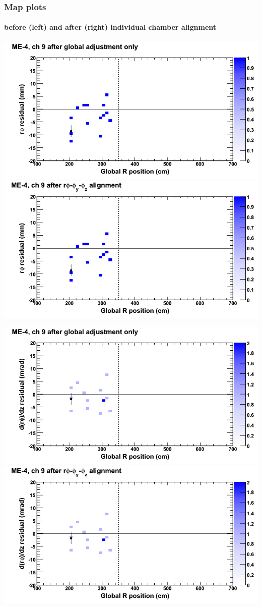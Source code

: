 \documentclass[compress]{beamer}
\begin{document}
\begin{frame}
\frametitle{Map plots}
\framesubtitle{before (left) and after (right) individual chamber alignment}
\includegraphics[width=0.5\linewidth]{ringmapplots_3dof/before_CSCvsr_mem4ch09_x.png} \includegraphics[width=0.5\linewidth]{ringmapplots_3dof/after_CSCvsr_mem4ch09_x.png}

\includegraphics[width=0.5\linewidth]{ringmapplots_3dof/before_CSCvsr_mem4ch09_dxdz.png} \includegraphics[width=0.5\linewidth]{ringmapplots_3dof/after_CSCvsr_mem4ch09_dxdz.png}
\end{frame}
\end{document}

